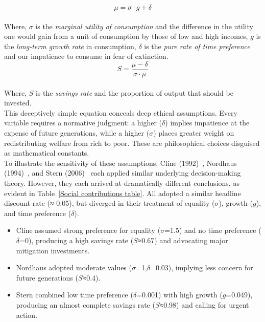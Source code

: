 \documentclass[12pt, oneside]{article}   	%
\begin{document}
\begin{equation}
\mu = \sigma \cdot g + \delta
\end{equation}\\

Where, $\sigma$ is the \emph{marginal utility of consumption} and the difference in the utility one would gain from a unit of consumption by those of low and high incomes, $g$ is the \emph{long-term growth rate} in consumption, $\delta$ is the \emph{pure rate of time preference} and our impatience to consume in fear of extinction.\\

\begin{equation}
S = \frac{\mu-\delta}{\sigma \cdot \mu}
\end{equation}\\

Where, $S$ is the \emph{savings rate} and the proportion of output that should be invested.\\

This deceptively simple equation conceals deep ethical assumptions.
Every variable requires a normative judgment: a higher ($\delta$) implies impatience at the expense of future generations, while a higher ($\sigma$) places greater weight on redistributing welfare from rich to poor.
These are philosophical choices disguised as mathematical constants.\\

To illustrate the sensitivity of these assumptions, Cline (1992)~\cite{wc1}, Nordhaus (1994)~\cite{wn1}, and Stern (2006)~\cite{ns1} each applied similar underlying decision-making theory.
However, they each arrived at dramatically different conclusions, as evident in Table~\ref{Social contributions table}.
All adopted a similar headline discount rate (≈ 0.05), but diverged in their treatment of equality ($\sigma$), growth ($g$), and time preference ($\delta$).\\

\begin{itemize}
	\item Cline assumed strong preference for equality ($\sigma$=1.5) and no time preference ($\delta$=0), producing a high savings rate ($S$≈0.67) and advocating major mitigation investments.
	\item Nordhaus adopted moderate values ($\sigma$=1,$\delta$=0.03), implying less concern for future generations ($S$≈0.4).
	\item Stern combined low time preference ($\delta$=0.001) with high growth ($g$=0.049), producing an almost complete savings rate ($S$≈0.98) and calling for urgent action.
\end{itemize}\\
\end{document}
